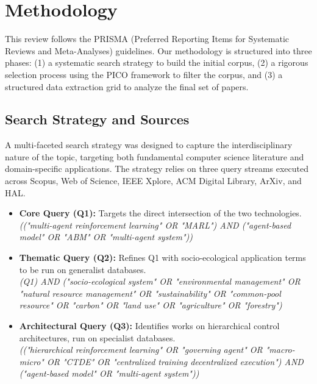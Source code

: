 \documentclass[conference]{IEEEtran}
\begin{document}
\section{Methodology}

This review follows the PRISMA (Preferred Reporting Items for Systematic Reviews and Meta-Analyses) guidelines. Our methodology is structured into three phases: (1) a systematic search strategy to build the initial corpus, (2) a rigorous selection process using the PICO framework to filter the corpus, and (3) a structured data extraction grid to analyze the final set of papers.

\subsection{Search Strategy and Sources}

A multi-faceted search strategy was designed to capture the interdisciplinary nature of the topic, targeting both fundamental computer science literature and domain-specific applications. The strategy relies on three query streams executed across Scopus, Web of Science, IEEE Xplore, ACM Digital Library, ArXiv, and HAL.

\begin{itemize}
    \item \textbf{Core Query (Q1):} Targets the direct intersection of the two technologies. \\
    \textit{(("multi-agent reinforcement learning" OR "MARL") AND ("agent-based model" OR "ABM" OR "multi-agent system"))}

    \item \textbf{Thematic Query (Q2):} Refines Q1 with socio-ecological application terms to be run on generalist databases. \\
    \textit{(Q1) AND ("socio-ecological system" OR "environmental management" OR "natural resource management" OR "sustainability" OR "common-pool resource" OR "carbon" OR "land use" OR "agriculture" OR "forestry")}

    \item \textbf{Architectural Query (Q3):} Identifies works on hierarchical control architectures, run on specialist databases. \\
    \textit{(("hierarchical reinforcement learning" OR "governing agent" OR "macro-micro" OR "CTDE" OR "centralized training decentralized execution") AND ("agent-based model" OR "multi-agent system"))}
\end{itemize}
\end{document}
